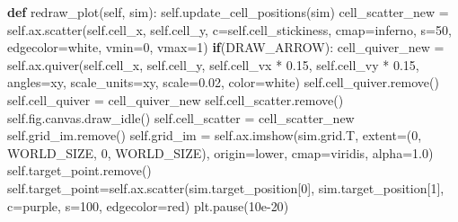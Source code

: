 \documentclass[
  letterpaper,
  DIV=11,
  numbers=noendperiod]{scrreprt}
\newenvironment{Shaded}{\begin{snugshade}}{\end{snugshade}}
\newcommand{\ControlFlowTok}[1]{\textcolor[rgb]{0.00,0.23,0.31}{\textbf{#1}}}
\newcommand{\DecValTok}[1]{\textcolor[rgb]{0.68,0.00,0.00}{#1}}
\newcommand{\FloatTok}[1]{\textcolor[rgb]{0.68,0.00,0.00}{#1}}
\newcommand{\KeywordTok}[1]{\textcolor[rgb]{0.00,0.23,0.31}{\textbf{#1}}}
\newcommand{\NormalTok}[1]{\textcolor[rgb]{0.00,0.23,0.31}{#1}}
\newcommand{\OperatorTok}[1]{\textcolor[rgb]{0.37,0.37,0.37}{#1}}
\newcommand{\StringTok}[1]{\textcolor[rgb]{0.13,0.47,0.30}{#1}}
\newcommand{\VariableTok}[1]{\textcolor[rgb]{0.07,0.07,0.07}{#1}}
\theoremstyle{definition}
\theoremstyle{remark}
\begin{document}
\begin{tcolorbox}
\begin{Shaded}
\begin{Highlighting}[]
    \KeywordTok{def}\NormalTok{ redraw\_plot(}\VariableTok{self}\NormalTok{, sim):}
        \VariableTok{self}\NormalTok{.update\_cell\_positions(sim)}
\NormalTok{        cell\_scatter\_new }\OperatorTok{=} \VariableTok{self}\NormalTok{.ax.scatter(}\VariableTok{self}\NormalTok{.cell\_x, }\VariableTok{self}\NormalTok{.cell\_y, c}\OperatorTok{=}\VariableTok{self}\NormalTok{.cell\_stickiness, cmap}\OperatorTok{=}\StringTok{\textquotesingle{}inferno\textquotesingle{}}\NormalTok{, s}\OperatorTok{=}\DecValTok{50}\NormalTok{, edgecolor}\OperatorTok{=}\StringTok{\textquotesingle{}white\textquotesingle{}}\NormalTok{, vmin}\OperatorTok{=}\DecValTok{0}\NormalTok{, vmax}\OperatorTok{=}\DecValTok{1}\NormalTok{)}
        \ControlFlowTok{if}\NormalTok{(DRAW\_ARROW): }
\NormalTok{            cell\_quiver\_new }\OperatorTok{=} \VariableTok{self}\NormalTok{.ax.quiver(}\VariableTok{self}\NormalTok{.cell\_x, }\VariableTok{self}\NormalTok{.cell\_y, }\VariableTok{self}\NormalTok{.cell\_vx }\OperatorTok{*} \FloatTok{0.15}\NormalTok{, }\VariableTok{self}\NormalTok{.cell\_vy }\OperatorTok{*} \FloatTok{0.15}\NormalTok{, angles}\OperatorTok{=}\StringTok{\textquotesingle{}xy\textquotesingle{}}\NormalTok{, scale\_units}\OperatorTok{=}\StringTok{\textquotesingle{}xy\textquotesingle{}}\NormalTok{, scale}\OperatorTok{=}\FloatTok{0.02}\NormalTok{, color}\OperatorTok{=}\StringTok{\textquotesingle{}white\textquotesingle{}}\NormalTok{)}
            \VariableTok{self}\NormalTok{.cell\_quiver.remove()}
            \VariableTok{self}\NormalTok{.cell\_quiver }\OperatorTok{=}\NormalTok{ cell\_quiver\_new}
        \VariableTok{self}\NormalTok{.cell\_scatter.remove()}
        \VariableTok{self}\NormalTok{.fig.canvas.draw\_idle()}
        \VariableTok{self}\NormalTok{.cell\_scatter }\OperatorTok{=}\NormalTok{ cell\_scatter\_new}
        \VariableTok{self}\NormalTok{.grid\_im.remove()}
        \VariableTok{self}\NormalTok{.grid\_im }\OperatorTok{=} \VariableTok{self}\NormalTok{.ax.imshow(sim.grid.T, extent}\OperatorTok{=}\NormalTok{(}\DecValTok{0}\NormalTok{, WORLD\_SIZE, }\DecValTok{0}\NormalTok{, WORLD\_SIZE), origin}\OperatorTok{=}\StringTok{\textquotesingle{}lower\textquotesingle{}}\NormalTok{, cmap}\OperatorTok{=}\StringTok{\textquotesingle{}viridis\textquotesingle{}}\NormalTok{, alpha}\OperatorTok{=}\FloatTok{1.0}\NormalTok{)}
        \VariableTok{self}\NormalTok{.target\_point.remove()}
        \VariableTok{self}\NormalTok{.target\_point}\OperatorTok{=}\VariableTok{self}\NormalTok{.ax.scatter(sim.target\_position[}\DecValTok{0}\NormalTok{], sim.target\_position[}\DecValTok{1}\NormalTok{], c}\OperatorTok{=}\StringTok{\textquotesingle{}purple\textquotesingle{}}\NormalTok{, s}\OperatorTok{=}\DecValTok{100}\NormalTok{, edgecolor}\OperatorTok{=}\StringTok{\textquotesingle{}red\textquotesingle{}}\NormalTok{)}
\NormalTok{        plt.pause(}\FloatTok{10e{-}20}\NormalTok{)}
            

\end{Highlighting}
\end{Shaded}
\end{tcolorbox}
\end{document}
